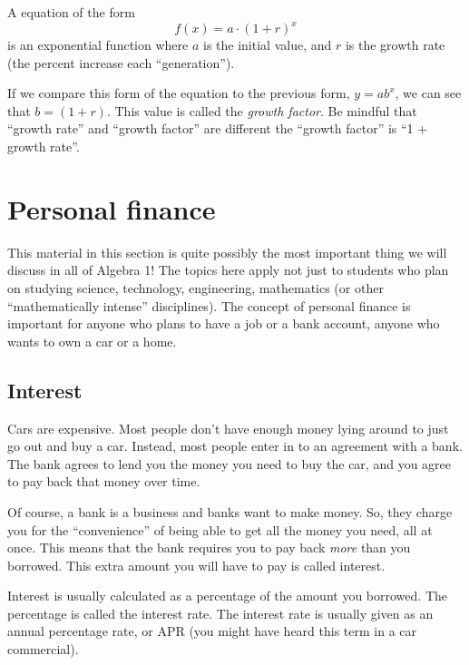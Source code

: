 \begin{boxdef}
A equation of the form \[f(x) = a\cdot(1+r)^x\] is an exponential function where $a$ is the initial value, and $r$ is the growth rate (the percent increase each ``generation'').
\end{boxdef}

If we compare this form of the equation to the previous form, $y=ab^x$, we can see that $b=(1+r)$. This value is called the \textit{growth factor}. Be mindful that ``growth rate'' and ``growth factor'' are different the ``growth factor'' is ``1 + growth rate''.


\section{Personal finance}
\label{sec:expofinance}

This material in this section is quite possibly the most important thing we will discuss in all of Algebra 1! The topics here apply not just to students who plan on studying science, technology, engineering, mathematics (or other ``mathematically intense'' disciplines). The concept of personal finance is important for anyone who plans to have a job or a bank account, anyone who wants to own a car or a home.

\subsection{Interest}

Cars are expensive. Most people don't have enough money lying around to just go out and buy a car. Instead, most people enter in to an agreement with a bank. The bank agrees to lend you the money you need to buy the car, and you agree to pay back that money over time.

Of course, a bank is a business and banks want to make money. So, they charge you for the ``convenience'' of being able to get all the money you need, all at once. This means that the bank requires you to pay back \textit{more} than you borrowed. This extra amount you will have to pay is called \gls{interest}.

Interest is usually calculated as a percentage of the amount you borrowed. The percentage is called the \gls{interest rate}. The interest rate is usually given as an annual percentage rate, or APR (you might have heard this term in a car commercial).

